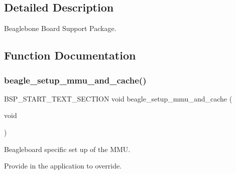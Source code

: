 \subsection{Detailed Description}
Beaglebone Board Support Package. 



\subsection{Function Documentation}
\mbox{\label{group__RTEMSBSPsARMBeagle_ga0c87308264dd017a7077234a981dca6e}} 
\subsubsection{\texorpdfstring{beagle\_setup\_mmu\_and\_cache()}{beagle\_setup\_mmu\_and\_cache()}}
{\footnotesize\ttfamily B\+S\+P\+\_\+\+S\+T\+A\+R\+T\+\_\+\+T\+E\+X\+T\+\_\+\+S\+E\+C\+T\+I\+ON void beagle\+\_\+setup\+\_\+mmu\+\_\+and\+\_\+cache (\begin{DoxyParamCaption}\item[{void}]{ }\end{DoxyParamCaption})}



Beagleboard specific set up of the M\+MU. 

Provide in the application to override. 